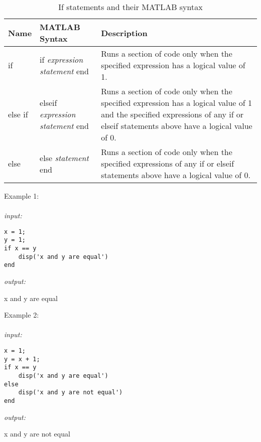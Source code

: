 \documentclass[../MATLAB_Primer.tex]{subfiles}
\begin{document}
\begin{table}[H]
\caption{If statements and their MATLAB syntax}
\begin{center}
\begin{tabular}{| C{1.5cm} | m{3cm} | m{8cm}|}
\hline
\textbf{Name} & \textbf{MATLAB Syntax} & \textbf{Description}\\
\hline
if & if \textit{expression} \newline \text{ } \textit{statement} \newline end & Runs a section of code only when the specified expression has a logical value of 1.\\
\hline
else if & elseif \textit{expression} \newline \text{ } \textit{statement} \newline end & Runs a section of code only when the specified expression has a logical value of 1 and the specified expressions of any if or elseif statements above have a logical value of 0.\\
\hline 
else & else \newline \text{ } \textit{statement} \newline end & Runs a section of code only when the specified expressions of any if or elseif statements above have a logical value of 0.\\
\hline
\end{tabular}
\label{tab:if}
\end{center}
\end{table}

Example 1:
\\ \\
\textit{input:}
\begin{lstlisting}[frame=single]
x = 1;
y = 1;
if x == y
    disp('x and y are equal')
end
\end{lstlisting}

\textit{output:}

\begin{center}
    x and y are equal
\end{center}

Example 2:
\\ \\
\textit{input:}
\begin{lstlisting}[frame=single]
x = 1;
y = x + 1;
if x == y
    disp('x and y are equal')
else
    disp('x and y are not equal')
end
\end{lstlisting}

\textit{output:}

\begin{center}
    x and y are not equal
\end{center}
\end{document}
